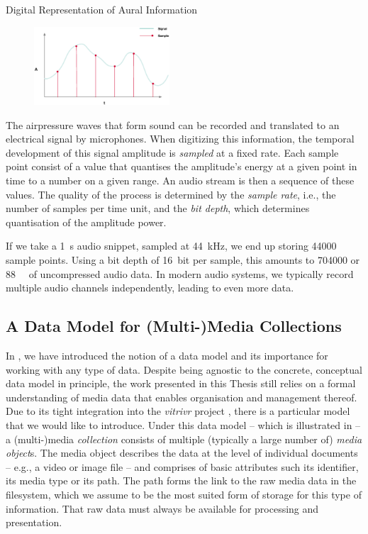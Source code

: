 \begin{example}[label=example:representation_audio_information]{Digital Representation of Aural Information}{}
    \begin{figure}
        \includegraphics[width=0.45\textwidth]{figures/example-audio-signal.eps}
    \end{figure}
    The airpressure waves that form sound can be recorded and translated to an electrical signal by microphones. When digitizing this information, the temporal development of this signal amplitude is \emph{sampled} at a fixed rate. Each sample point consist of a value that quantises the amplitude's energy at a given point in time to a number on a given range. An audio stream is then a sequence of these values. The quality of the process is determined by the \emph{sample rate}, i.e., the number of samples per time unit, and the \emph{bit depth}, which determines quantisation of the amplitude power.

    If we take a \SI{1}{\second} audio snippet, sampled at \SI{44}{\kilo\hertz}, we end up storing \num{44000} sample points. Using a bit depth of \SI{16}{bit} per sample, this amounts to \SI{704000}{\bit} or \SI{88}{\kilo\byte} of uncompressed audio data. In modern audio systems, we typically record multiple audio channels independently, leading to even more data.
\end{example}

\subsection{A Data Model for (Multi-)Media Collections}
\label{section:media_data_model}
In , we have introduced the notion of a data model and its importance for working with any type of data. Despite being agnostic to the concrete, conceptual data model in principle, the work presented in this Thesis still relies on a formal understanding of media data that enables organisation and management thereof. Due to its tight integration into the \emph{vitrivr} project \cite{Rossetto:2016vitrivr,Gasser:2019Multimodal,Heller:2020Multi}, there is a particular model that we would like to introduce. Under this data model -- which is illustrated in  -- a (multi-)media \emph{collection} consists of multiple (typically a large number of) \emph{media object}s. The media object describes the data at the level of individual documents -- e.g., a video or image file -- and comprises of basic attributes such its identifier, its media type or its path. The path forms the link to the raw media data in the filesystem, which we assume to be the most suited form of storage for this type of information. That raw data must always be available for processing and presentation.

